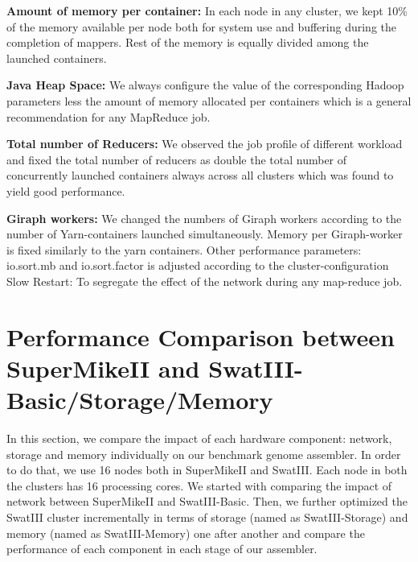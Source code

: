 \documentclass[conference]{IEEEtran}
\begin{document}
\textbf{Amount of memory per container:} In each node in any cluster, we kept 10\% of the memory available per node both for system use and buffering during the completion of mappers. Rest of the memory is equally divided among the launched containers.

\textbf{Java Heap Space:} We always configure the value of the corresponding Hadoop parameters less the amount of memory allocated per containers which is a general recommendation for any MapReduce job.

\textbf{Total number of Reducers:} We observed the job profile of different workload and fixed the total number of reducers as double the total number of concurrently launched containers always across all clusters which was found to yield good performance. 

\textbf{Giraph workers:} We changed the numbers of Giraph workers according to the number of Yarn-containers launched simultaneously. Memory per Giraph-worker is fixed similarly to the yarn containers.
Other performance parameters: io.sort.mb and io.sort.factor is adjusted according to the cluster-configuration
Slow Restart: To segregate the effect of the network during any map-reduce job.

\section {Performance Comparison between SuperMikeII and SwatIII-Basic/Storage/Memory} \label{IndividualHWEffect}
In this section, we compare the impact of each hardware component: network, storage and memory individually on our benchmark genome assembler.
In order to do that, we use 16 nodes both in SuperMikeII and SwatIII. Each node in both the clusters has 16 processing cores.
We started with comparing the impact of network between SuperMikeII and SwatIII-Basic.
Then, we further optimized the SwatIII cluster incrementally in terms of storage (named as SwatIII-Storage) and memory (named as SwatIII-Memory) one after another and compare the performance of each component in each stage of our assembler.
\end{document}
